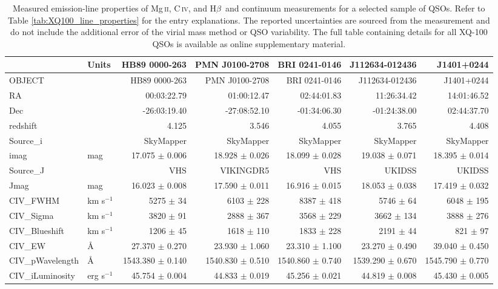 \documentclass[fleqn,usenatbib]{mnras}
\newcommand{\mgii}{Mg\,\textsc{ii}}
\newcommand{\civ}{C\,\textsc{iv}}
\newcommand{\hbeta}{H\textsc{$\beta$}}
\begin{document}
\begingroup
\begin{table*}
\caption {\label{tab:XQ100_properties_sample} Measured emission-line properties of \mgii, \civ, and \hbeta\ and continuum measurements for a selected sample of QSOs. Refer to Table \ref{tab:XQ100_line_properties} for the entry explanations. The reported uncertainties are sourced from the measurement and do not include the additional error of the virial mass method or QSO variability. The full table containing details for all XQ-100 QSOs is available as online supplementary material.}  
\begin{tabular}{llrrrrr}
\hline \hline
& Units & HB89 0000-263 & PMN J0100-2708 & BRI 0241-0146 & J112634-012436 & J1401+0244 \\ 
\hline
OBJECT &  & HB89 0000-263 & PMN J0100-2708 & BRI 0241-0146 & J112634-012436 & J1401+0244 \\ 
RA &  & 00:03:22.79 & 01:00:12.47 & 02:44:01.83 & 11:26:34.42 & 14:01:46.52 \\ 
Dec &  & -26:03:19.40 & -27:08:52.10 & -01:34:06.30 & -01:24:38.00 & 02:44:37.70 \\ 
redshift &  & 4.125 & 3.546 & 4.055 & 3.765 & 4.408 \\ 
Source\_i &  & SkyMapper & SkyMapper & SkyMapper & SkyMapper & SkyMapper \\ 
imag & mag & 17.075 $\pm$ 0.006 & 18.928 $\pm$ 0.026 & 18.099 $\pm$ 0.028 & 19.038 $\pm$ 0.071 & 18.395 $\pm$ 0.014 \\ 
Source\_J &  & VHS & VIKINGDR5 & VHS & UKIDSS & UKIDSS \\ 
Jmag & mag & 16.023 $\pm$ 0.008 & 17.590 $\pm$ 0.011 & 16.916 $\pm$ 0.015 & 18.053 $\pm$ 0.038 & 17.419 $\pm$ 0.032 \\ 
CIV\_FWHM & km s$^{-1}$ & 5275 $\pm$ 34 & 6103 $\pm$ 228 & 8387 $\pm$ 418 & 5746 $\pm$ 64 & 6048 $\pm$ 195 \\ 
CIV\_Sigma & km s$^{-1}$ & 3820 $\pm$ 91 & 2888 $\pm$ 367 & 3568 $\pm$ 229 & 3662 $\pm$ 134 & 3888 $\pm$ 276 \\ 
CIV\_Blueshift & km s$^{-1}$ & 1206 $\pm$ 45 & 1618 $\pm$ 110 & 1833 $\pm$ 228 & 2191 $\pm$ 44 & 821 $\pm$ 97 \\ 
CIV\_EW & \AA & 27.370 $\pm$ 0.270 & 23.930 $\pm$ 1.060 & 23.310 $\pm$ 1.100 & 23.270 $\pm$ 0.490 & 39.040 $\pm$ 0.450 \\ 
CIV\_pWavelength & \AA & 1543.380 $\pm$ 0.140 & 1540.830 $\pm$ 0.510 & 1540.860 $\pm$ 0.740 & 1539.290 $\pm$ 0.670 & 1545.790 $\pm$ 0.770 \\ 
CIV\_iLuminosity & erg s$^{-1}$ & 45.754 $\pm$ 0.004 & 44.833 $\pm$ 0.019 & 45.256 $\pm$ 0.021 & 44.819 $\pm$ 0.008 & 45.430 $\pm$ 0.005 \\ 

\end{tabular}
\end{table*}
\end{document}
